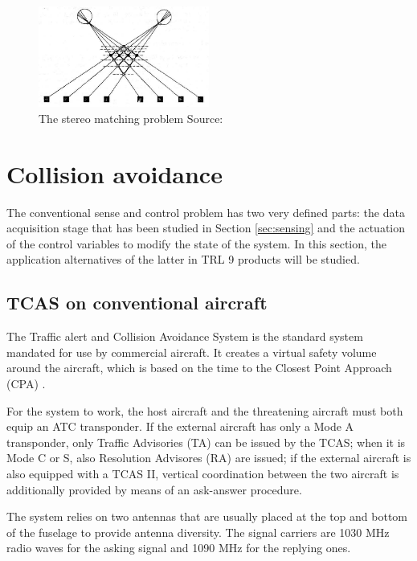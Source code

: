 \begin{figure}[htbp]
	\centering
	\includegraphics[width=0.5\textwidth]{./figures/stereo.png}
	\caption{The stereo matching problem {\footnotesize Source: \cite{ballard1982}}}
	\label{fig:stereo}
\end{figure}


\section{Collision avoidance}

The conventional sense and control problem has two very defined parts: the data acquisition stage that has been studied in Section \ref{sec:sensing} and the actuation of the control variables to modify the state of the system.
In this section, the application alternatives of the latter in TRL 9 \cite{assistantsecretaryofdefenseforresearchandengineering2011} products will be studied.

\subsection{TCAS on conventional aircraft}

The Traffic alert and Collision Avoidance System is the standard system mandated for use by commercial aircraft.
It creates a virtual safety volume around the aircraft, which is based on the time to the Closest Point Approach (CPA) \cite{tooley2009}.

For the system to work, the host aircraft and the threatening aircraft must both equip an ATC transponder.
If the external aircraft has only a Mode A transponder, only Traffic Advisories (TA) can be issued by the TCAS; when it is Mode C or S, also Resolution Advisores (RA) are issued; if the external aircraft is also equipped with a TCAS II, vertical coordination between the two aircraft is additionally provided by means of an ask-answer procedure.

The system relies on two antennas that are usually placed at the top and bottom of the fuselage to provide antenna diversity.
The signal carriers are 1030 MHz radio waves for the asking signal and 1090 MHz for the replying ones.

